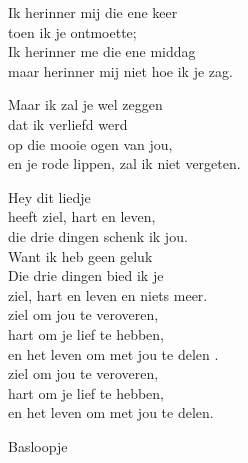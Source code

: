 \clearpage
\begin{translation}
Ik herinner mij die ene keer\\
toen ik je ontmoette;\\
Ik herinner me die ene middag\\
maar herinner mij niet hoe ik je zag.\vspace{\wlskip}

Maar ik zal je wel zeggen\\
dat ik verliefd werd\\
op die mooie ogen van jou,\\
en je rode lippen, zal ik niet vergeten.\vspace{\wlskip}

Hey dit liedje\\
heeft ziel, hart en leven,\\
die drie dingen schenk ik jou.\\
Want ik heb geen geluk\\
Die drie dingen bied ik je\\
ziel, hart en leven en niets meer.\\
ziel om jou te veroveren,\\
hart om je lief te hebben,\\
en het leven om met jou te delen .\\
ziel om jou te veroveren,\\
hart om je lief te hebben,\\
en het leven om met jou te delen. 
\end{translation}

\begin{instrumental}{Basloopje}
     
       
\end{instrumental}
